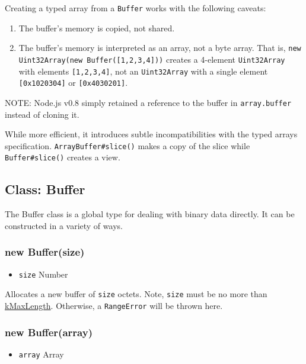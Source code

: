 Creating a typed array from a \texttt{Buffer} works with the following
caveats:

\begin{enumerate}
\def\labelenumi{\arabic{enumi}.}
\item
  The buffer's memory is copied, not shared.
\item
  The buffer's memory is interpreted as an array, not a byte array. That
  is, \texttt{new Uint32Array(new Buffer({[}1,2,3,4{]}))} creates a
  4-element \texttt{Uint32Array} with elements \texttt{{[}1,2,3,4{]}},
  not an \texttt{Uint32Array} with a single element
  \texttt{{[}0x1020304{]}} or \texttt{{[}0x4030201{]}}.
\end{enumerate}

NOTE: Node.js v0.8 simply retained a reference to the buffer in
\texttt{array.buffer} instead of cloning it.

While more efficient, it introduces subtle incompatibilities with the
typed arrays specification. \texttt{ArrayBuffer\#slice()} makes a copy
of the slice while \texttt{Buffer\#slice()} creates a view.

\subsection{Class: Buffer}\label{class-buffer}

The Buffer class is a global type for dealing with binary data directly.
It can be constructed in a variety of ways.

\subsubsection{new Buffer(size)}\label{new-buffersize}

\begin{itemize}
\itemsep1pt\parskip0pt
\item
  \texttt{size} Number
\end{itemize}

Allocates a new buffer of \texttt{size} octets. Note, \texttt{size} must
be no more than
\href{smalloc.html\#smalloc_smalloc_kmaxlength}{kMaxLength}. Otherwise,
a \texttt{RangeError} will be thrown here.

\subsubsection{new Buffer(array)}\label{new-bufferarray}

\begin{itemize}
\itemsep1pt\parskip0pt
\item
  \texttt{array} Array
\end{itemize}


